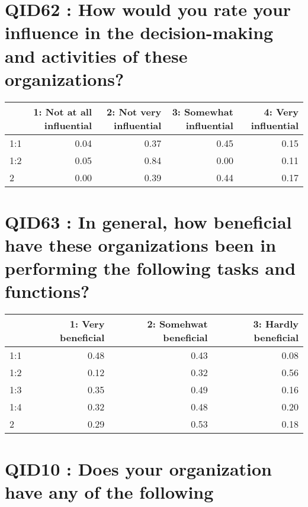 \documentclass[]{article}
\begin{document}
\section{QID62 : How would you rate your influence in the
decision-making and activities of these
organizations?}\label{qid62-how-would-you-rate-your-influence-in-the-decision-making-and-activities-of-these-organizations}

\begin{table}[H]
\centering\begingroup\fontsize{30}{32}\selectfont

\begin{tabular}{l|r|r|r|r}
\hline
  & 1: Not at all influential &  2: Not very influential &  3: Somewhat influential &  4: Very influential\\
\hline
1:1 & 0.04 & 0.37 & 0.45 & 0.15\\
\hline
1:2 & 0.05 & 0.84 & 0.00 & 0.11\\
\hline
2 & 0.00 & 0.39 & 0.44 & 0.17\\
\hline
\end{tabular}
\endgroup{}
\end{table}

\section{QID63 : In general, how beneficial have these organizations
been in performing the following tasks and
functions?}\label{qid63-in-general-how-beneficial-have-these-organizations-been-in-performing-the-following-tasks-and-functions}

\begin{table}[H]
\centering\begingroup\fontsize{30}{32}\selectfont

\begin{tabular}{l|r|r|r}
\hline
  & 1: Very beneficial  &  2: Somehwat beneficial &  3: Hardly beneficial\\
\hline
1:1 & 0.48 & 0.43 & 0.08\\
\hline
1:2 & 0.12 & 0.32 & 0.56\\
\hline
1:3 & 0.35 & 0.49 & 0.16\\
\hline
1:4 & 0.32 & 0.48 & 0.20\\
\hline
2 & 0.29 & 0.53 & 0.18\\
\hline
\end{tabular}
\endgroup{}
\end{table}

\section{QID10 : Does your organization have any of the
following}\label{qid10-does-your-organization-have-any-of-the-following}
\end{document}
